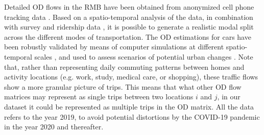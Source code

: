 Detailed OD flows in the RMB have been obtained from anonymized cell phone tracking data \citep{Calvet2020ObtencioM2019}. Based on a spatio-temporal analysis of the data, in combination with survey and ridership data \citep{PerezSans2021}, it is possible to generate a realistic modal split across the different modes of transportation. The OD estimations for cars have been robustly validated by means of computer simulations at different spatio-temporal scales \citep{ArgotaSanchez-Vaquerizo2021}, and used to assess scenarios of potential urban changes \citep{ArgotaSanchez-Vaquerizo2023LessCity-making}.
Note that, rather than representing daily commuting patterns between homes and activity locations (e.g. work, study, medical care, or shopping), these traffic flows show a more granular picture of trips. This means that what other OD flow matrices may represent as single trips between two locations $i$ and $j$, in our dataset it could be represented as multiple trips in the OD matrix.
All the data refers to the year 2019, to avoid potential distortions by the COVID-19 pandemic in the year 2020 and thereafter.

